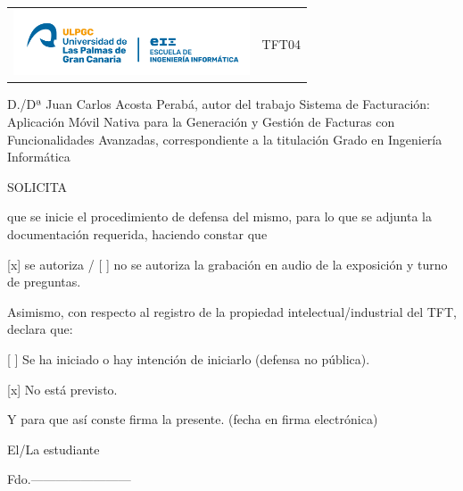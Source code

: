 
\thispagestyle{empty}

\begin{tabular}{p{15cm}p{5cm}}
  \includegraphics[width=7cm]{Ilustraciones/NuevoLogoEII.png}   &  TFT04\\
\end{tabular}

\vspace{1em}
\fboxrule=2pt
\begin{center}
\end{center}

\vspace{1em}
\justify
D./Dª Juan Carlos Acosta Perabá, autor del trabajo Sistema de Facturación: Aplicación Móvil Nativa para la Generación y Gestión de Facturas con Funcionalidades Avanzadas, correspondiente a la titulación Grado en Ingeniería Informática

\vspace{1em}
SOLICITA

\vspace{1em}
que se inicie el procedimiento de defensa del mismo, para lo que se adjunta la documentación requerida, haciendo constar que 

[x] se autoriza / [ ] no se autoriza la grabación en audio de la exposición y turno de preguntas.

\vspace{1em}
Asimismo, con respecto al registro de la propiedad intelectual/industrial del TFT, declara que:

[ ] Se ha iniciado o hay intención de iniciarlo (defensa no pública).

[x] No está previsto.

\vspace{1em}
Y para que así conste firma la presente. (fecha en firma electrónica)

\begin{center}

\vspace{1em}
El/La estudiante

\vspace{3em}
Fdo.------------------------
\end{center}

